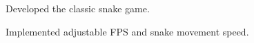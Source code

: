 \documentclass[letterpaper]{kevin-resume} %
\begin{document}
\begin{minipage}[t]{0.66\textwidth}
\sectionspace %


\begin{tightitemize}
 	\item Developed the classic snake game.
 	\item Implemented adjustable FPS and snake movement speed.
\end{tightitemize}

\sectionspace %


\end{minipage} %








\end{document}
